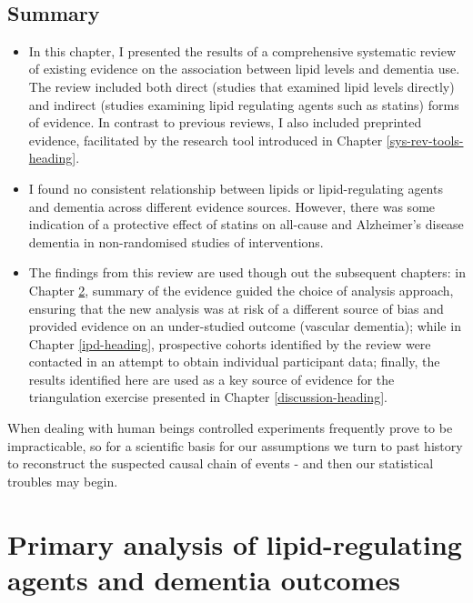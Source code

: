\documentclass[a4paper, twoside]{templates/ociamthesis}
\begin{document}
~

\hypertarget{summary-3}{%
\section{Summary}\label{summary-3}}

\begin{itemize}
\item
  In this chapter, I presented the results of a comprehensive systematic review of existing evidence on the association between lipid levels and dementia use. The review included both direct (studies that examined lipid levels directly) and indirect (studies examining lipid regulating agents such as statins) forms of evidence. In contrast to previous reviews, I also included preprinted evidence, facilitated by the research tool introduced in Chapter \ref{sys-rev-tools-heading}.
\item
  I found no consistent relationship between lipids or lipid-regulating agents and dementia across different evidence sources. However, there was some indication of a protective effect of statins on all-cause and Alzheimer's disease dementia in non-randomised studies of interventions.
\item
  The findings from this review are used though out the subsequent chapters: in Chapter \ref{cprd-analysis-heading}, summary of the evidence guided the choice of analysis approach, ensuring that the new analysis was at risk of a different source of bias and provided evidence on an under-studied outcome (vascular dementia); while in Chapter \ref{ipd-heading}, prospective cohorts identified by the review were contacted in an attempt to obtain individual participant data; finally, the results identified here are used as a key source of evidence for the triangulation exercise presented in Chapter \ref{discussion-heading}.
\end{itemize}

\newpage

\begin{savequote}
When dealing with human beings controlled experiments frequently prove
to be impracticable, so for a scientific basis for our assumptions we
turn to past history to reconstruct the suspected causal chain of events
- and then our statistical troubles may begin.
\end{savequote}



\hypertarget{cprd-analysis-heading}{%
\chapter{Primary analysis of lipid-regulating agents and dementia outcomes}\label{cprd-analysis-heading}}
\end{document}
